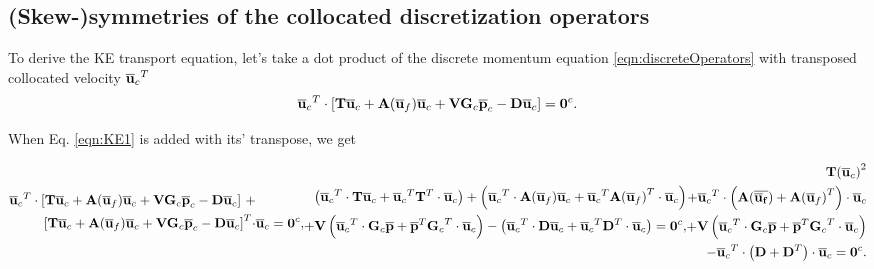 \subsection{(Skew-)symmetries of the collocated discretization operators}

To derive the KE transport equation, let's take a dot product of the discrete momentum equation \eqref{eqn:discreteOperators} with transposed collocated velocity ${\overline{\mathbf{u}}_c}^T$
\begin{align}
{\overline{\mathbf{u}}_c}^T \cdot
\left[ 
 \mathbf{T}\overline{\mathbf{u}}_c 
 + \mathbf{A}( \overline{\mathbf{u}}_f ) {\overline{\mathbf{u}}_c} 
 + \mathbf{V} \mathbf{G}_c \overline{\mathbf{p}}_c
 - \mathbf{D} {\overline{\mathbf{u}}_c}
\right] = \mathbf{0}^c.
\label{eqn:KE1}
\end{align}

When Eq. \eqref{eqn:KE1} is added with its' transpose, we get 

\begin{subequations}
\begin{align}
\begin{split}
\transDot{\avb{u}_c}
\left[ 
 \mathbf{T}\avb{u}_c 
 + \mathbf{A}( \avb{u}_f ) {\avb{u}_c} 
 + \mathbf{V} \mathbf{G}_c \avb{p}_c
 - \mathbf{D} {\avb{u}_c}
\right] \, + & 
\\
\transDot{
 \left[ 
 \mathbf{T}\avb{u}_c 
 + \mathbf{A}( \avb{u}_f ) {\avb{u}_c} 
 + \mathbf{V} \mathbf{G}_c \avb{p}_c 
 - \mathbf{D} {\avb{u}_c}
 \right] 
} & {\avb{u}_c} = \mathbf{0}^c,
\end{split}
\end{align}
\begin{align}
\begin{split}
\left( 
 \transDot{\avb{u}_c} \mathbf{T} \avb{u}_c + 
 {\avb{u}_c}^T \transDot{\mathbf{T}} {\avb{u}_c}
\right)
 + \left(
 \transDot{\avb{u}_c} \mathbf{A}(\avb{u}_f) {\avb{u}_c} + 
 {\avb{u}_c}^T \transDot{\mathbf{A}(\avb{u}_f)} {\avb{u}_c}
\right)
\\
 + \mathbf{V} \left(
 \transDot{\avb{u}_c} \mathbf{G}_c \avb{p} +
 \avb{p}^T \transDot{\mathbf{G}_c} {\avb{u}_c}
\right)
- \left(
 \transDot{\avb{u}_c} \mathbf{D} {\avb{u}_c} +
 {\avb{u}_c}^T \transDot{\mathbf{D}} {\avb{u}_c}
\right)
 = \mathbf{0}^c,
\end{split}
\end{align}
\begin{align}
\begin{split}
\mathbf{T} {(\avb{u}_c)}^2 
\\
+
{\avb{u}_c}^T \cdot
\left( 
{\mathbf{A}(\mathbf{\avb{\avb{u}_f}})} + {\mathbf{A}(\avb{u}_f)}^T
\right) \cdot
{\avb{u}_c}
\\
+
\mathbf{V} \left(
 \transDot{\avb{u}_c} \mathbf{G}_c \avb{p} +
 \avb{p}^T \transDot{\mathbf{G}_c} {\avb{u}_c}
\right) 
\\
-
\transDot{\avb{u}_c}
 \left( \mathbf{D} + {\mathbf{D}}^T \right)
 \cdot {\avb{u}_c}
= \mathbf{0}^c. 
\end{split}
\end{align}
\label{eqn:operatorProperties}
\end{subequations}

